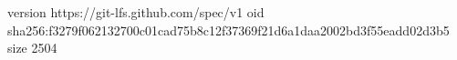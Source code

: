 version https://git-lfs.github.com/spec/v1
oid sha256:f3279f062132700c01cad75b8c12f37369f21d6a1daa2002bd3f55eadd02d3b5
size 2504
